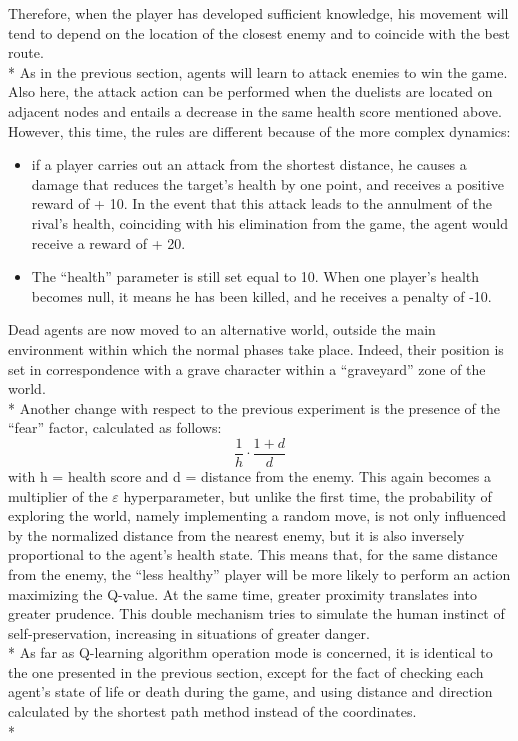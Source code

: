 Therefore, when the player has developed sufficient knowledge, his movement will tend to depend on the location of the closest enemy and to coincide with the best route.\\*
As in the previous section, agents will learn to attack enemies to win the game. Also here, the attack action can be performed when the duelists are located on adjacent nodes and entails a decrease in the same health score mentioned above. However, this time, the rules are different because of the more complex dynamics:
\begin{itemize}[noitemsep, topsep=0ex]
  \item if a player carries out an attack from the shortest distance, he causes a damage that reduces the target's health by one point, and receives a positive reward of + 10. In the event that this attack leads to the annulment of the rival's health, coinciding with his elimination from the game, the agent would receive a reward of + 20.
  \item The ``health'' parameter is still set equal to 10. When one player's health becomes null, it means he has been killed, and he receives a penalty of -10.
\end{itemize}
Dead agents are now moved to an alternative world, outside the main environment within which the normal phases take place. Indeed, their position is set in correspondence with a grave character within a ``graveyard'' zone of the world.\\*
Another change with respect to the previous experiment is the presence of the ``fear'' factor, calculated as follows:
$$\frac{1}{h}\cdot\frac{1+d}{d}$$
with h = health score and d = distance from the enemy.
This again becomes a multiplier of the $\varepsilon$ hyperparameter, but unlike the first time, the probability of exploring the world, namely implementing a random move, is not only influenced by the normalized distance from the nearest enemy, but it is also inversely proportional to the agent's health state. This means that, for the same distance from the enemy, the ``less healthy'' player will be more likely to perform an action maximizing the Q-value. At the same time, greater 	proximity translates into greater prudence. This double mechanism tries to simulate the human instinct of self-preservation, increasing in situations of greater danger.\\*
As far as Q-learning algorithm operation mode is concerned, it is identical to the one presented in the previous section, except for the fact of checking each agent's state of life or death during the game, and using distance and direction calculated by the shortest path method instead of the coordinates.\\*
